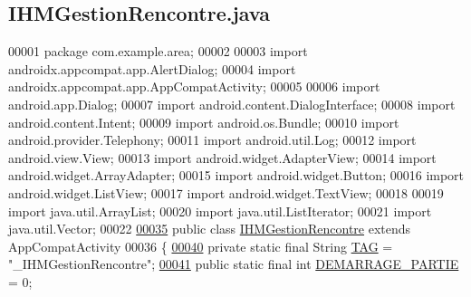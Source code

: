\hypertarget{_i_h_m_gestion_rencontre_8java_source}{}\subsection{I\+H\+M\+Gestion\+Rencontre.\+java}
\label{_i_h_m_gestion_rencontre_8java_source}

\begin{DoxyCode}
00001 \textcolor{keyword}{package }com.example.area;
00002 
00003 \textcolor{keyword}{import} androidx.appcompat.app.AlertDialog;
00004 \textcolor{keyword}{import} androidx.appcompat.app.AppCompatActivity;
00005 
00006 \textcolor{keyword}{import} android.app.Dialog;
00007 \textcolor{keyword}{import} android.content.DialogInterface;
00008 \textcolor{keyword}{import} android.content.Intent;
00009 \textcolor{keyword}{import} android.os.Bundle;
00010 \textcolor{keyword}{import} android.provider.Telephony;
00011 \textcolor{keyword}{import} android.util.Log;
00012 \textcolor{keyword}{import} android.view.View;
00013 \textcolor{keyword}{import} android.widget.AdapterView;
00014 \textcolor{keyword}{import} android.widget.ArrayAdapter;
00015 \textcolor{keyword}{import} android.widget.Button;
00016 \textcolor{keyword}{import} android.widget.ListView;
00017 \textcolor{keyword}{import} android.widget.TextView;
00018 
00019 \textcolor{keyword}{import} java.util.ArrayList;
00020 \textcolor{keyword}{import} java.util.ListIterator;
00021 \textcolor{keyword}{import} java.util.Vector;
00022 
\hyperlink{classcom_1_1example_1_1area_1_1_i_h_m_gestion_rencontre}{00035} \textcolor{keyword}{public} \textcolor{keyword}{class }\hyperlink{classcom_1_1example_1_1area_1_1_i_h_m_gestion_rencontre}{IHMGestionRencontre} \textcolor{keyword}{extends} AppCompatActivity
00036 \{
\hyperlink{classcom_1_1example_1_1area_1_1_i_h_m_gestion_rencontre_a0ac4d9152d48619cd697c8c69166219f}{00040}     \textcolor{keyword}{private} \textcolor{keyword}{static} \textcolor{keyword}{final} String \hyperlink{classcom_1_1example_1_1area_1_1_i_h_m_gestion_rencontre_a0ac4d9152d48619cd697c8c69166219f}{TAG} = \textcolor{stringliteral}{"\_IHMGestionRencontre"};  
\hyperlink{classcom_1_1example_1_1area_1_1_i_h_m_gestion_rencontre_a752975e509f051f66f3f06a744807f21}{00041}     \textcolor{keyword}{public} \textcolor{keyword}{static} \textcolor{keyword}{final} \textcolor{keywordtype}{int} \hyperlink{classcom_1_1example_1_1area_1_1_i_h_m_gestion_rencontre_a752975e509f051f66f3f06a744807f21}{DEMARRAGE\_PARTIE} = 0;  

\end{DoxyCode}
